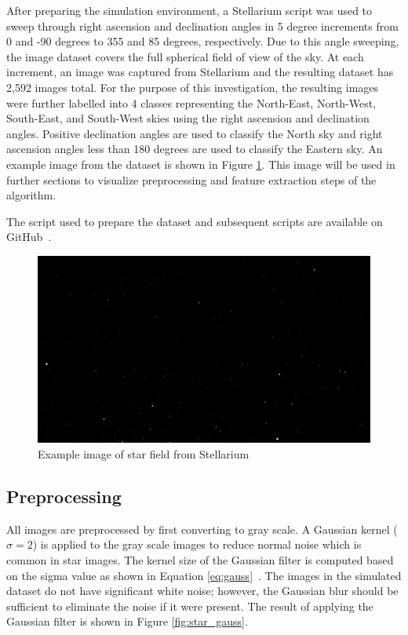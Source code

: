 \documentclass[10pt,twocolumn,letterpaper]{article}
\begin{document}
After preparing the simulation environment, a Stellarium script was used to sweep through right ascension and declination angles in 5 degree increments from 0 and -90 degrees to 355 and 85 degrees, respectively. Due to this angle sweeping, the image dataset covers the full spherical field of view of the sky. At each increment, an image was captured from Stellarium and the resulting dataset has 2,592 images total. For the purpose of this investigation, the resulting images were further labelled into 4 classes representing the North-East, North-West, South-East, and South-West skies using the right ascension and declination angles. Positive declination angles are used to classify the North sky and right ascension angles less than 180 degrees are used to classify the Eastern sky. An example image from the dataset is shown in Figure \ref{fig:star_img}. This image will be used in further sections to visualize preprocessing and feature extraction steps of the algorithm.

The script used to prepare the dataset and subsequent scripts are available on GitHub~\cite{git}.

\begin{figure}[H]
  \centering
   \includegraphics[width=0.9\linewidth]{stars_000}
   \caption{Example image of star field from Stellarium}
   \label{fig:star_img}
\end{figure}

\subsection{Preprocessing}

All images are preprocessed by first converting to gray scale. A Gaussian kernel ($\sigma = 2$) is applied to the gray scale images to reduce normal noise which is common in star images. The kernel size of the Gaussian filter is computed based on the sigma value as shown in Equation \ref{eq:gauss}~\cite{opencv}. The images in the simulated dataset do not have significant white noise; however, the Gaussian blur should be sufficient to eliminate the noise if it were present. The result of applying the Gaussian filter is shown in Figure \ref{fig:star_gauss}.
\end{document}
